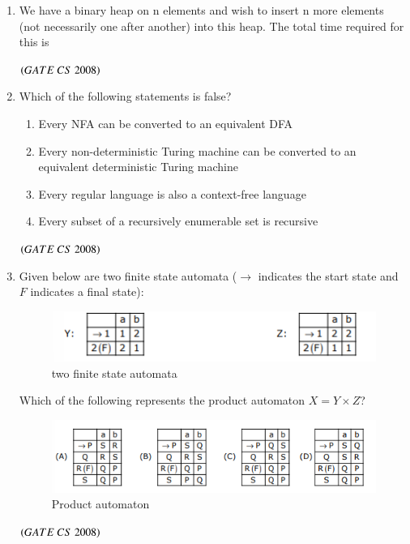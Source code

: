 \documentclass[journal]{IEEEtran}
\numberwithin{equation}{enumi}
\numberwithin{figure}{enumi}
\begin{document}
\begin{enumerate}
\item We have a binary heap on n elements and wish to insert n more elements (not necessarily one after another) into this heap. The total time required for this is
\begin{enumerate} 
\end{enumerate}
\hfill $\left(GATE\ CS\  2008\right)$

\item Which of the following statements is false?
\begin{enumerate}
   \item  Every NFA can be converted to an equivalent DFA 
   \item Every non-deterministic Turing machine can be converted to an equivalent deterministic Turing machine 
   \item Every regular language is also a context-free language 
   \item Every subset of a recursively enumerable set is recursive
\end{enumerate}
\hfill $\left(GATE\ CS\  2008\right)$
 

\item  Given below are two finite state automata ($\rightarrow$ indicates the start state and $F$ indicates a final state):
\begin{figure}[H]
    \centering
    \includegraphics[width=0.5\columnwidth]{figs/fig5.png}
    \caption{two finite state automata}
    \label{figs:5}
\end{figure}

Which of the following represents the product automaton $X = Y \times Z$?
\begin{figure}[H]
    \centering
    \includegraphics[width=0.5\columnwidth]{figs/fig6.png}
    \caption{Product automaton}
    \label{fig:6}
\end{figure}
\hfill $\left(GATE\ CS\  2008\right)$
 


\end{enumerate}
\end{document}
